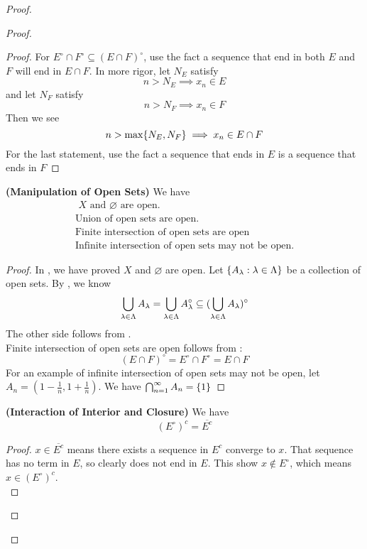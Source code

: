 \documentclass{report}
\begin{document}
\begin{proof}
\begin{proof}
\begin{proof}
For $E^\circ \cap F^\circ \subseteq (E\cap F)^\circ $, use the fact a sequence that end in both $E$ and  $F$ will end in  $E\cap F$. In more rigor, let $N_E$ satisfy
 \begin{equation}
n>N_E\implies x_n\in E
\end{equation}
and let $N_F$ satisfy
\begin{equation}
n>N_F\implies x_n\in F
\end{equation}
Then we see
\begin{equation}
n>\max \{ N_E,N_F \}\implies x_n\in E\cap F
\end{equation}
For the last statement, use the fact a sequence that ends in $E$ is a sequence that ends in  $F$
\end{proof}
\begin{theorem}
\label{3.3.5}
\textbf{(Manipulation of Open Sets)} We have
\begin{gather}
\text{ $X$ and  $\varnothing$ are open. }\\
\text{ Union of open sets are open. }\\
\text{ Finite intersection of open sets are open}\\
\text{ Infinite intersection of open sets may not be open. }
\end{gather}
\end{theorem}
\begin{proof}
In , we have proved $X$ and $\varnothing$ are open. Let $\{ A_\lambda :\lambda \in\Lambda  \}$ be a collection of open sets. By , we know
\begin{equation}
\bigcup_{\lambda \in \Lambda } A_\lambda= \bigcup_{\lambda  \in \Lambda }A_\lambda ^\circ \subseteq (\bigcup_{\lambda  \in \Lambda } A_\lambda )^\circ 
\end{equation}
The other side follows from .\\

Finite intersection of open sets are open follows from :
\begin{equation}
  (E\cap F)^\circ =E^\circ \cap F^\circ =E\cap F
\end{equation}
For an example of infinite intersection of open sets may not be open, let $A_n=(1-\frac{1}{n},1+\frac{1}{n})$. We have $\bigcap_{n=1}^\infty A_n=\{ 1 \}$
\end{proof}
\begin{theorem}
\label{3.3.6}
\textbf{(Interaction of Interior and Closure)} We have
\begin{equation}
  (E^\circ )^c=\overline{E^c}
\end{equation}
\end{theorem}
\begin{proof}
$x\in \overline{E^c}$ means there exists a sequence in $E^c$ converge to  $x$. That sequence has no term in $E$, so clearly does not end in  $E$. This show  $x\not \in E^\circ $, which means $x\in (E^\circ )^c$.\\


\end{proof}
\end{proof}
\end{proof}
\end{document}
